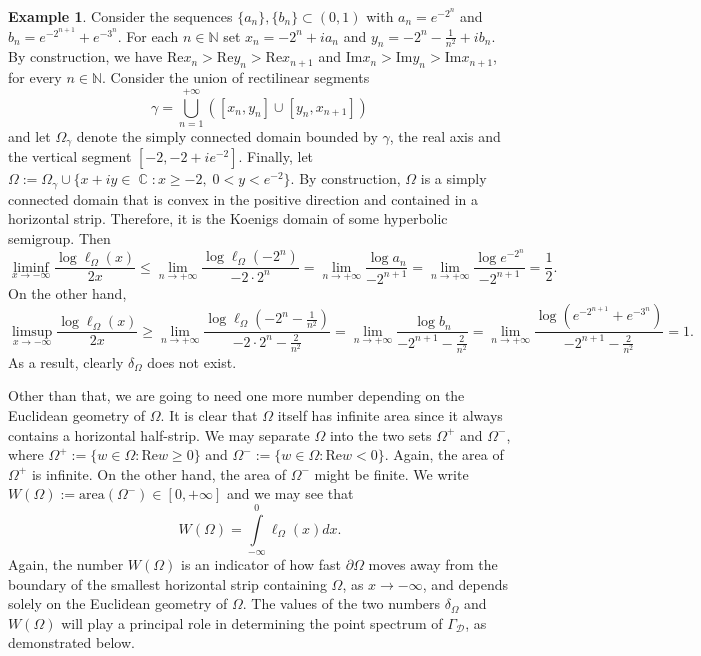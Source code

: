 \documentclass[11pt]{amsart}
\numberwithin{equation}{section}
\theoremstyle{definition}
\newtheorem{example}[theorem]{Example}
\DeclareMathOperator{\C}{\mathbb{C}}
\begin{document}
	\begin{example}\label{ex:limit does not exist}
		Consider the sequences $\{a_n\}, \{b_n\}\subset(0,1)$ with $a_n=e^{-2^n}$ and $b_n=e^{-2^{n+1}}+e^{-3^n}$. For each $n\in\mathbb{N}$ set $x_n=-2^n+ia_n$ and $y_n=-2^n-\frac{1}{n^2}+ib_n$. By construction, we have $\mathrm{Re}x_n>\mathrm{Re}y_n>\mathrm{Re}x_{n+1}$ and $\mathrm{Im}x_n>\mathrm{Im}y_n>\mathrm{Im}x_{n+1}$, for every $n\in\mathbb{N}$. Consider the union of rectilinear segments
		$$\gamma=\bigcup\limits_{n=1}^{+\infty}\left([x_n,y_n]\cup[y_n,x_{n+1}]\right)$$
		and let $\Omega_\gamma$ denote the simply connected domain bounded by $\gamma$, the real axis and the vertical segment $[-2,-2+ie^{-2}]$. Finally, let $\Omega:=\Omega_\gamma\cup\{x+iy\in\C:x\ge-2, \; 0<y<e^{-2}\}$. By construction, $\Omega$ is a simply connected domain that is convex in the positive direction and contained in a horizontal strip. Therefore, it is the Koenigs domain of some hyperbolic semigroup. Then
		$$\liminf\limits_{x\to-\infty}\dfrac{\log\ell_\Omega(x)}{2x}\le\lim\limits_{n\to+\infty}\dfrac{\log\ell_\Omega(-2^n)}{-2\cdot2^n}=\lim\limits_{n\to+\infty}\dfrac{\log a_n}{-2^{n+1}}=\lim\limits_{n\to+\infty}\dfrac{\log e^{-2^n}}{-2^{n+1}}=\dfrac{1}{2}.$$
		On the other hand,
		$$\limsup\limits_{x\to-\infty}\dfrac{\log\ell_\Omega(x)}{2x}\ge\lim\limits_{n\to+\infty}\dfrac{\log\ell_\Omega\left(-2^n-\frac{1}{n^2}\right)}{-2\cdot 2^n-\frac{2}{n^2}}=\lim\limits_{n\to+\infty}\dfrac{\log b_n}{-2^{n+1}-\frac{2}{n^2}}=\lim\limits_{n\to+\infty}\dfrac{\log(e^{-2^{n+1}}+e^{-3^n})}{-2^{n+1}-\frac{2}{n^2}}=1.$$
		As a result, clearly $\delta_\Omega$ does not exist.
	\end{example}
	
	Other than that, we are going to need one more number depending on the Euclidean geometry of $\Omega$. It is clear that $\Omega$ itself has infinite area since it always contains a horizontal half-strip. We may separate $\Omega$ into the two sets $\Omega^+$ and $\Omega^-$, where $\Omega^+:=\{w\in\Omega:\mathrm{Re}w\ge0\}$ and $\Omega^-:=\{w\in\Omega:\mathrm{Re}w< 0\}$. Again, the area of $\Omega^+$ is infinite. On the other hand, the area of $\Omega^-$ might be finite. We write $W(\Omega):=\mathrm{area}(\Omega^-)\in[0,+\infty]$ and we may see that
	$$W(\Omega)=\int\limits_{-\infty}^{0}\ell_\Omega(x)dx.$$
	Again, the number $W(\Omega)$ is an indicator of how fast $\partial\Omega$ moves away from the boundary of the smallest horizontal strip containing $\Omega$, as $x\to-\infty$, and depends solely on the Euclidean geometry of $\Omega$. The values of the two numbers $\delta_\Omega$ and $W(\Omega)$ will play a principal role in determining the point spectrum of $\Gamma_\mathcal{D}$, as demonstrated below. 
	
\end{document}
